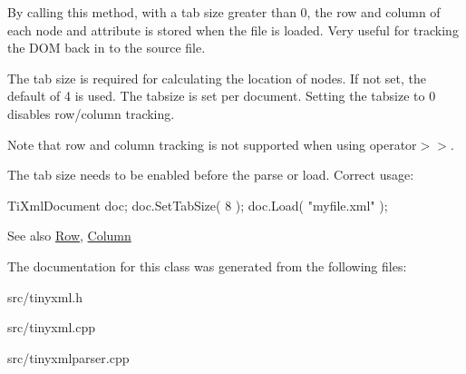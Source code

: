 By calling this method, with a tab size greater than 0, the row and column of each node and attribute is stored when the file is loaded. Very useful for tracking the D\+OM back in to the source file.

The tab size is required for calculating the location of nodes. If not set, the default of 4 is used. The tabsize is set per document. Setting the tabsize to 0 disables row/column tracking.

Note that row and column tracking is not supported when using operator$>$$>$.

The tab size needs to be enabled before the parse or load. Correct usage\+: \begin{DoxyVerb}TiXmlDocument doc;
doc.SetTabSize( 8 );
doc.Load( "myfile.xml" );
\end{DoxyVerb}


\begin{DoxySeeAlso}{See also}
\hyperlink{classTiXmlBase_a024bceb070188df92c2a8d8852dd0853}{Row}, \hyperlink{classTiXmlBase_ab54bfb9b70fe6dd276e7b279cab7f003}{Column} 
\end{DoxySeeAlso}


The documentation for this class was generated from the following files\+:\begin{DoxyCompactItemize}
\item 
src/tinyxml.\+h\item 
src/tinyxml.\+cpp\item 
src/tinyxmlparser.\+cpp\end{DoxyCompactItemize}
